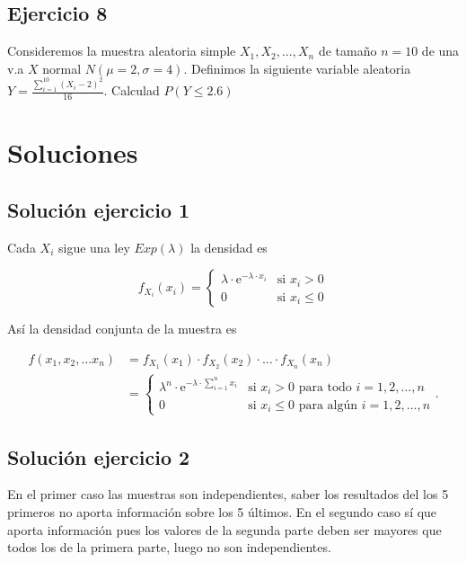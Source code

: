 \documentclass[
]{article}
\begin{document}
\hypertarget{ejercicio-8}{%
\subsection{Ejercicio 8}\label{ejercicio-8}}

Consideremos la muestra aleatoria simple \(X_1,X_2,\ldots,X_{n}\) de
tamaño \(n=10\) de una v.a \(X\) normal \(N(\mu=2,\sigma=4)\). Definimos
la siguiente variable aleatoria
\(Y=\frac{\sum\limits_{i=1}^{10}{(X_i-2)}^2}{16}\). Calculad
\(P(Y\leq 2.6)\)

\hypertarget{soluciones}{%
\section{Soluciones}\label{soluciones}}

\hypertarget{soluciuxf3n-ejercicio-1}{%
\subsection{Solución ejercicio 1}\label{soluciuxf3n-ejercicio-1}}

Cada \(X_i\) sigue una ley \(Exp(\lambda)\) la densidad es

\[
f_{X_i}(x_i)=\left\{
\begin{array}{ll}
\lambda\cdot\mathrm{e}^{-\lambda\cdot x_i} & \mbox{si }x_i>0\\
0 & \mbox{si }x_i\leq 0
\end{array}
\right.
\]

Así la densidad conjunta de la muestra es

\[\begin{array}{rl}
f(x_1,x_2,\ldots x_n) &=f_{X_1}(x_1)\cdot f_{X_2}(x_2)\cdot \ldots\cdot f_{X_n}(x_n)\\
&=
\left\{
\begin{array}{ll}
\lambda^n \cdot\mathrm{e}^{-\lambda\cdot \sum_{i=1}^n x_i} & \mbox{si }x_i>0 \mbox{ para todo } i=1,2,\ldots, n\\
0 & \mbox{si } x_i\leq 0 \mbox{ para algún } i=1,2,\ldots, n 
\end{array}
\right.
.
\end{array}
\]

\hypertarget{soluciuxf3n-ejercicio-2}{%
\subsection{Solución ejercicio 2}\label{soluciuxf3n-ejercicio-2}}

En el primer caso las muestras son independientes, saber los resultados
del los 5 primeros no aporta información sobre los 5 últimos. En el
segundo caso sí que aporta información pues los valores de la segunda
parte deben ser mayores que todos los de la primera parte, luego no son
independientes.
\end{document}
